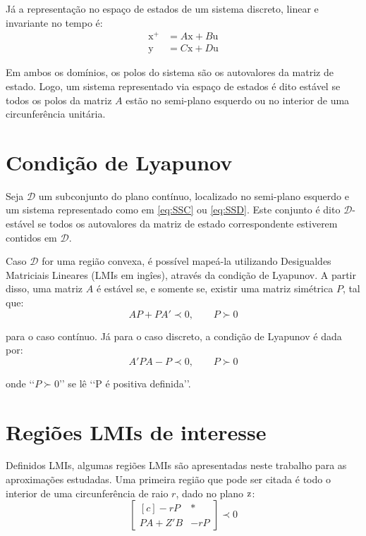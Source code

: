 Já a representação no espaço de estados de um sistema discreto, linear e invariante no tempo é:
\begin{subequations}
  \label{eq:SSD}
  \begin{align}
    \pmb{\mathrm{x^+}} &= A\pmb{\mathrm{x}} + B\pmb{\mathrm{u}}\label{eq:SSDEntrada}\\
    \pmb{\mathrm{y}} &= C\pmb{\mathrm{x}} + D\pmb{\mathrm{u}}\label{eq:SSDSaida}
  \end{align}
\end{subequations}

Em ambos os domínios, os polos do sistema são os autovalores da matriz de estado. Logo, um sistema representado via espaço de estados é dito estável se todos os polos da matriz $A$ estão no semi-plano esquerdo ou no interior de uma circunferência unitária.

\section{Condição de Lyapunov}\label{sec:LyapunovCondition}
Seja $\mathcal{D}$ um subconjunto do plano contínuo, localizado no semi-plano esquerdo e um sistema representado como em \eqref{eq:SSC} ou \eqref{eq:SSD}. Este conjunto é dito $\mathcal{D}$-estável se todos os autovalores da matriz de estado correspondente estiverem contidos em $\mathcal{D}$.

Caso $\mathcal{D}$ for uma região convexa, é possível mapeá-la utilizando Desigualdes Matriciais Lineares (LMIs em ingîes)\cite{CHILALI1996}, através da condição de Lyapunov. A partir disso, uma matriz $A$ é estável se, e somente se, existir uma matriz simétrica $P$, tal que:
\begin{equation}
  AP + PA' \prec 0, \qquad P \succ 0\label{eq:LyapunovConditionS}
\end{equation}

\noindent para o caso contínuo. Já para o caso discreto, a condição de Lyapunov é dada por:
\begin{equation}
  A'PA - P \prec 0, \qquad P \succ 0\label{eq:LyapunovConditionD}
\end{equation}

\noindent onde \lq{}\lq{}$P \succ 0$\rq{}\rq{} se lê \lq{}\lq{}P é positiva definida\rq{}\rq{}.

\section{Regiões LMIs de interesse}
Definidos LMIs, algumas regiões LMIs são apresentadas neste trabalho para as aproximações estudadas. Uma primeira região que pode ser citada é todo o interior de uma circunferência de raio $r$, dado no plano $\operatorname{\mathrm{z}}$:
\begin{equation}
  \begin{bmatrix*}[c]
    -rP       & * \\
    PA + Z'B  & -rP
  \end{bmatrix*}
  \prec 0\label{eq:LMIEstabilidadeRelativa}
\end{equation}

